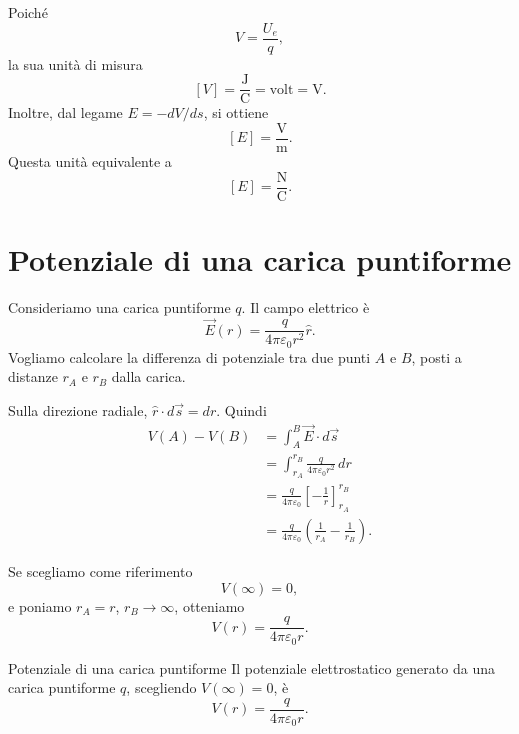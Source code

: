 \documentclass[a4paper]{article}
\begin{document}
Poiché
\[
    V=\frac{U_e}{q},
\]
la sua unità di misura
\[
    [V]=\frac{\mathrm{J}}{\mathrm{C}}=\mathrm{volt}=\mathrm{V}.
\]
Inoltre, dal legame \(E=-dV/ds\), si ottiene
\[
    [E]=\frac{\mathrm{V}}{\mathrm{m}}.
\]
Questa unità  equivalente a
\[
    [E]=\frac{\mathrm{N}}{\mathrm{C}}.
\]

\section{Potenziale di una carica puntiforme}

Consideriamo una carica puntiforme \(q\). Il campo elettrico è
\[
    \vec{E}(r)=\frac{q}{4\pi\varepsilon_0r^2}\hat{r}.
\]
Vogliamo calcolare la differenza di potenziale tra due punti \(A\) e \(B\), posti a distanze \(r_A\) e \(r_B\) dalla carica.

\begin{center}
\end{center}

Sulla direzione radiale, \(\hat{r}\cdot d\vec{s}=dr\). Quindi
\begin{align*}
    V(A)-V(B)
    &=\int_A^B \vec{E}\cdot d\vec{s} \\
    &=\int_{r_A}^{r_B}\frac{q}{4\pi\varepsilon_0r^2}\,dr \\
    &=\frac{q}{4\pi\varepsilon_0}\left[-\frac{1}{r}\right]_{r_A}^{r_B} \\
    &=\frac{q}{4\pi\varepsilon_0}\left(\frac{1}{r_A}-\frac{1}{r_B}\right).
\end{align*}

Se scegliamo come riferimento
\[
    V(\infty)=0,
\]
e poniamo \(r_A=r\), \(r_B\to\infty\), otteniamo
\[
    V(r)=\frac{q}{4\pi\varepsilon_0r}.
\]

\begin{snippettheorem}{Potenziale di una carica puntiforme}
    Il potenziale elettrostatico generato da una carica puntiforme \(q\), scegliendo \(V(\infty)=0\), è
    \[
        V(r)=\frac{q}{4\pi\varepsilon_0r}.
    \]
\end{snippettheorem}
\end{document}
